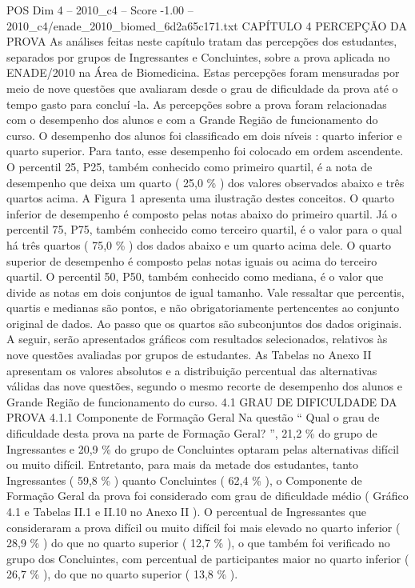 \begin{textsample}{POS Dim 4 – 2010\_c4 – Score -1.00 – 2010\_c4/enade\_2010\_biomed\_6d2a65c171.txt}  \label{ex:f4_pos_291}
CAPÍTULO 4 PERCEPÇÃO DA PROVA As análises feitas neste capítulo tratam das percepções dos estudantes, separados por grupos de Ingressantes e Concluintes, sobre a prova aplicada no ENADE/2010 na Área de Biomedicina.
Estas percepções foram mensuradas por meio de nove questões que avaliaram desde o grau de dificuldade da prova até o tempo gasto para concluí -la.
As percepções sobre a prova foram relacionadas com o desempenho dos alunos e com a Grande Região de funcionamento do curso.
O desempenho dos alunos foi classificado em dois níveis : quarto inferior e quarto superior.
Para tanto, esse desempenho foi colocado em ordem ascendente.
O percentil 25, P25, também conhecido como primeiro quartil, é a nota de desempenho que deixa um quarto ( 25,0 \% ) dos valores observados abaixo e três quartos acima.
A Figura 1 apresenta uma ilustração destes conceitos.
O quarto inferior de desempenho é composto pelas notas abaixo do primeiro quartil.
Já o percentil 75, P75, também conhecido como terceiro quartil, é o valor para o qual há três quartos ( 75,0 \% ) dos dados abaixo e um quarto acima dele.
O quarto superior de desempenho é composto pelas notas iguais ou acima do terceiro quartil.
O percentil 50, P50, também conhecido como mediana, é o valor que divide as notas em dois conjuntos de igual tamanho.
Vale ressaltar que percentis, quartis e medianas são pontos, e não obrigatoriamente pertencentes ao conjunto original de dados.
Ao passo que os quartos são subconjuntos dos dados originais.
A seguir, serão apresentados gráficos com resultados selecionados, relativos às nove questões avaliadas por grupos de estudantes.
As Tabelas no Anexo II apresentam os valores absolutos e a distribuição percentual das alternativas válidas das nove questões, segundo o mesmo recorte de desempenho dos alunos e Grande Região de funcionamento do curso. 4.1 GRAU DE DIFICULDADE DA PROVA 4.1.1 Componente de Formação Geral Na questão “ Qual o grau de dificuldade desta prova na parte de Formação Geral? ”, 21,2 \% do grupo de Ingressantes e 20,9 \% do grupo de Concluintes optaram pelas alternativas difícil ou muito difícil.
Entretanto, para mais da metade dos estudantes, tanto Ingressantes ( 59,8 \% ) quanto Concluintes ( 62,4 \% ), o Componente de Formação Geral da prova foi considerado com grau de dificuldade médio ( Gráfico 4.1 e Tabelas II.1 e II.10 no Anexo II ).
O percentual de Ingressantes que consideraram a prova difícil ou muito difícil foi mais elevado no quarto inferior ( 28,9 \% ) do que no quarto superior ( 12,7 \% ), o que também foi verificado no grupo dos Concluintes, com percentual de participantes maior no quarto inferior ( 26,7 \% ), do que no quarto superior ( 13,8 \% ).

\end{textsample}
